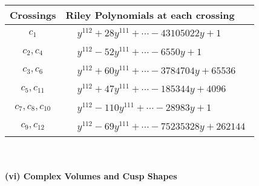 \documentclass[1p]{elsarticle_modified}
\theoremstyle{definition}
\begin{document}
\begin{tabular}{m{50pt}|m{274pt}}
Crossings & \hspace{64pt}Riley Polynomials at each crossing \\
\hline $$\begin{aligned}c_{1}\end{aligned}$$&$\begin{aligned}
&y^{112}+28 y^{111}+\cdots-43105022 y+1
\end{aligned}$\\
\hline $$\begin{aligned}c_{2},c_{4}\end{aligned}$$&$\begin{aligned}
&y^{112}-52 y^{111}+\cdots-6550 y+1
\end{aligned}$\\
\hline $$\begin{aligned}c_{3},c_{6}\end{aligned}$$&$\begin{aligned}
&y^{112}+60 y^{111}+\cdots-3784704 y+65536
\end{aligned}$\\
\hline $$\begin{aligned}c_{5},c_{11}\end{aligned}$$&$\begin{aligned}
&y^{112}+47 y^{111}+\cdots-185344 y+4096
\end{aligned}$\\
\hline $$\begin{aligned}c_{7},c_{8},c_{10}\end{aligned}$$&$\begin{aligned}
&y^{112}-110 y^{111}+\cdots-28983 y+1
\end{aligned}$\\
\hline $$\begin{aligned}c_{9},c_{12}\end{aligned}$$&$\begin{aligned}
&y^{112}-69 y^{111}+\cdots-75235328 y+262144
\end{aligned}$\\
\hline
\end{tabular}\\~\\
\newpage\flushleft \textbf{(vi) Complex Volumes and Cusp Shapes}
\end{document}
